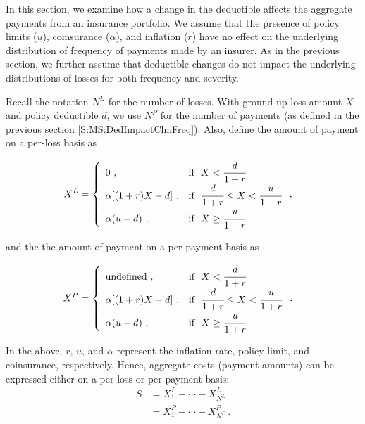 \documentclass[]{book}
\theoremstyle{definition}
\theoremstyle{definition}
\theoremstyle{definition}
\theoremstyle{remark}
\begin{document}
In this section, we examine how a change in the deductible affects the
aggregate payments from an insurance portfolio. We assume that the
presence of policy limits (\(u\)), coinsurance (\(\alpha\)), and
inflation (\(r\)) have no effect on the underlying distribution of
frequency of payments made by an insurer. As in the previous section, we
further assume that deductible changes do not impact the underlying
distributions of losses for both frequency and severity.

Recall the notation \(N^L\) for the number of losses. With ground-up
loss amount \(X\) and policy deductible \(d\), we use \(N^P\) for the
number of payments (as defined in the previous section
\ref{S:MS:DedImpactClmFreq}). Also, define the amount of payment on a
per-loss basis as

\begin{eqnarray*}
    X^{L}&=\left\{
      \begin{array}{ll}
        0 ~, & \text{if } ~X<\cfrac{d}{1+r} \\
        \alpha[(1+r)X-d]~, & \text{if } ~\cfrac{d}{1+r}\leq X<\cfrac{u}{1+r} \\
        \alpha(u-d)~, &  \text{if } ~X \ge \cfrac{u}{1+r}\\
      \end{array}
\right.,
\end{eqnarray*}

and the the amount of payment on a per-payment basis as

\begin{eqnarray*}
    X^{P}&=\left\{
      \begin{array}{ll}
        {\rm undefined} ~, & \text{if }~ X<\cfrac{d}{1+r} \\
        \alpha[(1+r)X-d]~, & \text{if }~ \cfrac{d}{1+r}\leq X<\cfrac{u}{1+r} \\
        \alpha(u-d)~, &  \text{if } ~ X \ge \cfrac{u}{1+r}\\
      \end{array}
\right..
\end{eqnarray*}

In the above, \(r\), \(u\), and \(\alpha\) represent the inflation rate,
policy limit, and coinsurance, respectively. Hence, aggregate costs
(payment amounts) can be expressed either on a per loss or per payment
basis: \[\begin{aligned}
S &= X^L_1 + \cdots + X^L_{N^L} \\
&=X^P_1 + \cdots + X^P_{N^P} ~.
\end{aligned}\]
\end{document}
